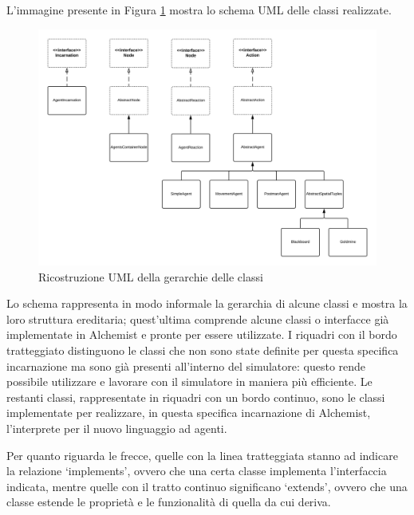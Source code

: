 L'immagine presente in Figura \ref{fig:UMLGerarchiaClassi} mostra lo schema UML delle classi realizzate.
\begin{figure}%
\includegraphics[width=15cm]{images/UML_agenti.png} %
\caption[Ricostruzione UML della gerarchia delle classi]{Ricostruzione UML della gerarchie delle classi} \label{fig:UMLGerarchiaClassi}
\end{figure}

Lo schema rappresenta in modo informale la gerarchia di alcune classi e mostra la loro struttura ereditaria; quest'ultima comprende alcune classi o interfacce già implementate in Alchemist e pronte per essere utilizzate. I riquadri con il bordo tratteggiato distinguono le classi che non sono state definite per questa specifica incarnazione ma sono già presenti all'interno del simulatore: questo rende possibile utilizzare e lavorare con il simulatore in maniera più efficiente. Le restanti classi, rappresentate in riquadri con un bordo continuo, sono le classi implementate per realizzare, in questa specifica incarnazione di Alchemist, l'interprete per il nuovo linguaggio ad agenti.

Per quanto riguarda le frecce, quelle con la linea tratteggiata stanno ad indicare la relazione `implements', ovvero che una certa classe implementa l'interfaccia indicata, mentre quelle con il tratto continuo significano `extends', ovvero che una classe estende le proprietà e le funzionalità di quella da cui deriva.

